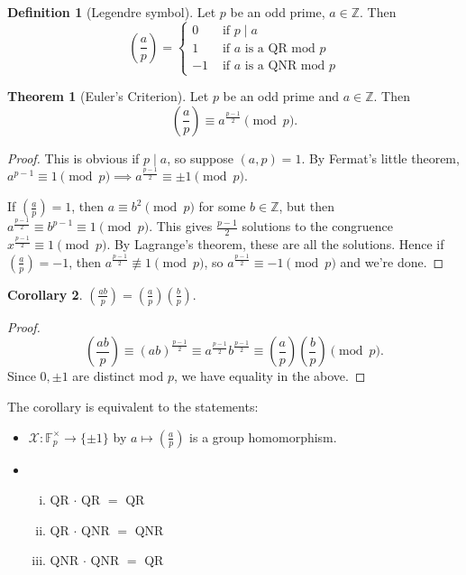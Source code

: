 \documentclass{article}
\theoremstyle{definition}
\newtheorem{theorem}{Theorem}[section]
\newtheorem{cor}[theorem]{Corollary}
\newtheorem{defn}{Definition}[section]
\begin{document}
\begin{defn}[Legendre symbol]
    Let $p$ be an odd prime, $a \in \mathbb{Z}$. Then
    \[
    \left(\frac{a}{p}\right) = \begin{cases}
        0 &\text{ if } p \mid a\\
        1 &\text{ if } a \text{ is a QR mod } p\\
        -1&\text{ if } a \text{ is a QNR mod } p
    \end{cases}
    \]
\end{defn}
\begin{theorem}[Euler's Criterion]
    Let $p$ be an odd prime and $a \in \mathbb{Z}$. Then 
    \[
        \left(\frac{a}{p}\right) \equiv a^{\frac{p-1}{2}} \pmod{p}.
    \]
\end{theorem}
\begin{proof}
    This is obvious if $p \mid a$, so suppose $(a,p)=1$. By Fermat's little theorem, $a^{p-1}\equiv 1\pmod{p} \implies a^{\frac{p-1}{2}} \equiv \pm 1 \pmod{p}$.

    If $\left(\frac{a}{p}\right) =1$, then $a \equiv b^2 \pmod{p}$ for some $b \in \mathbb{Z}$, but then $a^{\frac{p-1}{2}} \equiv b^{p-1} \equiv 1 \pmod{p}$. This gives $\frac{p-1}{2}$ solutions to the congruence $x^{\frac{p-1}{2}} \equiv 1 \pmod{p}$. By Lagrange's theorem, these are all the solutions. Hence if $\left(\frac{a}{p}\right) = -1$, then $a^{\frac{p-1}{2}}\not\equiv 1\pmod{p}$, so $a^{\frac{p-1}{2}} \equiv -1 \pmod{p}$ and we're done.
\end{proof}
\begin{cor} %
    $\left(\frac{ab}{p}\right) = \left(\frac{a}{p}\right)\left(\frac{b}{p}\right)$.
\end{cor}
\begin{proof}
    \[
    \left(\frac{ab}{p}\right) \equiv (ab)^{\frac{p-1}{2}} \equiv a^{\frac{p-1}{2}}b^{\frac{p-1}{2}} \equiv \left(\frac{a}{p}\right)\left(\frac{b}{p}\right) \pmod{p}.
    \]
    Since $0, \pm 1$ are distinct mod $p$, we have equality in the above.
\end{proof}
The corollary is equivalent to the statements:
\begin{itemize}
    \item $\mathcal{X}: \mathbb{F}_p^{\times} \to \{\pm 1\}$ by $a \mapsto \left(\frac{a}{p}\right)$ is a group homomorphism.
    \item \begin{enumerate}[(i)]
        \item QR $\cdot$ QR $=$ QR
        \item QR $\cdot$ QNR $=$ QNR
        \item QNR $\cdot$ QNR $=$ QR
    \end{enumerate}    
\end{itemize}
\end{document}
